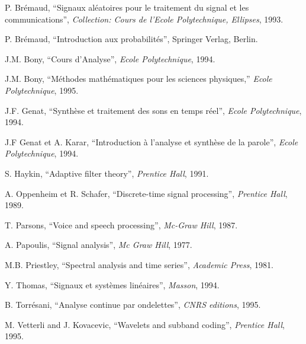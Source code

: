 \begin{thebibliography}{99}

 P. Br\'emaud,
``Signaux al\'eatoires pour le traitement du signal et les communications'',
{\em Collection: Cours de l'Ecole Polytechnique, Ellipses}, 1993.

 P. Br\'emaud,
``Introduction aux probabilit\'es'', Springer Verlag, Berlin.

 J.M. Bony,
``Cours d'Analyse'',
{\em Ecole Polytechnique}, 1994.

 J.M. Bony,
``M\'ethodes math\'ematiques pour les sciences physiques,''
{\em Ecole Polytechnique}, 1995.

 J.F. Genat,
``Synth\`ese et traitement des sons en temps r\'eel'',
{\em Ecole Polytechnique}, 1994.

 J.F Genat et A. Karar,
``Introduction \`a l'analyse et synth\`ese de la parole'',
{\em Ecole Polytechnique}, 1994.

 S. Haykin,
``Adaptive filter theory'',
{\em Prentice Hall}, 1991.


 A. Oppenheim et R. Schafer,
``Discrete-time signal processing'',
{\em Prentice Hall}, 1989.

 T. Parsons,
``Voice and speech processing'',
{\em Mc-Graw Hill}, 1987.

 A. Papoulis,
``Signal analysis'',
{\em Mc Graw Hill}, 1977.

 M.B. Priestley,
``Spectral analysis and time series'',
{\em Academic Press}, 1981.

 Y. Thomas,
``Signaux et syst\`emes lin\'eaires'',
{\em Masson}, 1994.

 B. Torr\'esani,
``Analyse continue par ondelettes'',
{\em CNRS editions}, {1995}.

 M. Vetterli and J. Kovacevic,
``Wavelets and subband coding'',
{\em Prentice Hall}, 1995.

\end{thebibliography} 